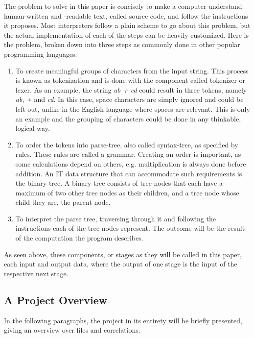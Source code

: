 \documentclass[12pt,a4paper]{article}
\newcommand{\pagelabel}[1]{\phantomsection\label{#1}}
\begin{document}
The problem to solve in this paper is concisely to make a computer understand
human-written and -readable text, called source code, and follow the instructions
it proposes.
Most interpreters follow a plain scheme to go about this problem, but the
actual implementation of each of the steps can be heavily customized.
Here is the problem, broken down into three steps as commonly done in other
popular programming languages:
\begin{enumerate}\pagelabel{simple_interpreter}
    \item To create meaningful groups of characters from the input string. This
        process is known as tokenization and is done with the component called
        tokenizer or lexer. As an example, the string \emph{ab + cd} could result
        in three tokens, namely \emph{ab}, \emph{+} and \emph{cd}. In this case, space characters
        are simply ignored and could be left out, unlike in the English language where spaces are relevant. 
        This is only an example and the grouping of characters could be done 
        in any thinkable, logical way.
    \item To order the tokens into parse-tree, also called syntax-tree, as
        specified by rules. These rules are called a grammar.
        Creating an order is important, as some calculations depend on others, e.g. multiplication
        is always done before addition. An IT data structure that can accommodate
        such requirements is the binary tree. A binary tree consists of tree-nodes
        that each have a maximum of two other tree nodes as their children, and
        a tree node whose child they are, the parent node.
    \item To interpret the parse tree, traversing through it and following the
        instructions each of the tree-nodes represent. The outcome
        will be the result of the computation the program describes.
\end{enumerate}

As seen above, these components, or stages as they will be called in this paper,
each input and output data, where the output of one stage is the input of the
respective next stage.

\subsection{A Project Overview}
In the following paragraphs, the project in its entirety will be briefly
presented, giving an overview over files and correlations.
\end{document}
